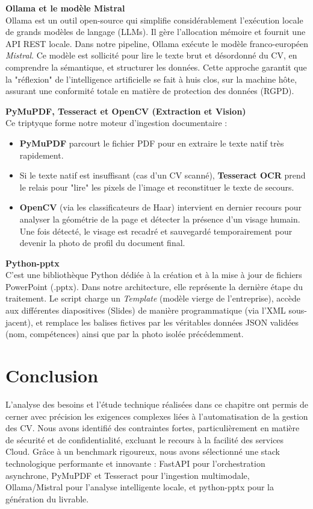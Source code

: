 \textbf{Ollama et le modèle Mistral} \\
Ollama est un outil open-source qui simplifie considérablement l'exécution locale de grands modèles de langage (LLMs). Il gère l'allocation mémoire et fournit une API REST locale. Dans notre pipeline, Ollama exécute le modèle franco-européen \textit{Mistral}. Ce modèle est sollicité pour lire le texte brut et désordonné du CV, en comprendre la sémantique, et structurer les données. Cette approche garantit que la "réflexion" de l'intelligence artificielle se fait à huis clos, sur la machine hôte, assurant une conformité totale en matière de protection des données (RGPD).

\textbf{PyMuPDF, Tesseract et OpenCV (Extraction et Vision)} \\
Ce triptyque forme notre moteur d'ingestion documentaire :
\begin{itemize}
    \item \textbf{PyMuPDF} parcourt le fichier PDF pour en extraire le texte natif très rapidement.
    \item Si le texte natif est insuffisant (cas d'un CV scanné), \textbf{Tesseract OCR} prend le relais pour "lire" les pixels de l'image et reconstituer le texte de secours.
    \item \textbf{OpenCV} (via les classificateurs de Haar) intervient en dernier recours pour analyser la géométrie de la page et détecter la présence d'un visage humain. Une fois détecté, le visage est recadré et sauvegardé temporairement pour devenir la photo de profil du document final.
\end{itemize}

\textbf{Python-pptx} \\
C'est une bibliothèque Python dédiée à la création et à la mise à jour de fichiers PowerPoint (.pptx). Dans notre architecture, elle représente la dernière étape du traitement. Le script charge un \textit{Template} (modèle vierge de l'entreprise), accède aux différentes diapositives (Slides) de manière programmatique (via l'XML sous-jacent), et remplace les balises fictives par les véritables données JSON validées (nom, compétences) ainsi que par la photo isolée précédemment.


\section{Conclusion}

L'analyse des besoins et l'étude technique réalisées dans ce chapitre ont permis de cerner avec précision les exigences complexes liées à l'automatisation de la gestion des CV. Nous avons identifié des contraintes fortes, particulièrement en matière de sécurité et de confidentialité, excluant le recours à la facilité des services Cloud. Grâce à un benchmark rigoureux, nous avons sélectionné une stack technologique performante et innovante : FastAPI pour l'orchestration asynchrone, PyMuPDF et Tesseract pour l'ingestion multimodale, Ollama/Mistral pour l'analyse intelligente locale, et python-pptx pour la génération du livrable. 


